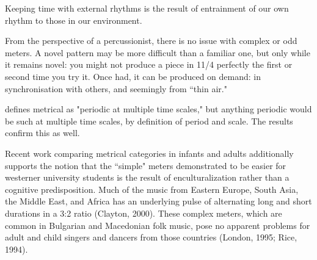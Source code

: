 %

 Keeping time with external rhythms is the result of entrainment of our own rhythm to those in our environment. \citep{chronobiology, musicCognition} 

From the perspective of a percussionist, there is no issue with complex or odd meters. A novel pattern may be more difficult than a familiar one, but only while it remains novel: you might not produce a piece in 11/4 perfectly the first or second time you try it. Once had, it can be produced on demand: in synchronisation with others, and seemingly from ``thin air."

\citep{patel2005} defines metrical as "periodic at multiple time scales," but anything periodic would be such at multiple time scales, by definition of period and scale. The results confirm this as well. 









Recent work comparing metrical categories in infants and adults additionally supports the notion that the ``simple" meters demonstrated to be easier for westerner university students is the result of enculturalization rather than a cognitive predisposition. 
Much of the music from Eastern Europe, South Asia, the Middle East, and Africa has an underlying pulse of alternating long and short durations in a 3:2 ratio (Clayton, 2000). These complex meters, which are common in Bulgarian and Macedonian folk music, pose no apparent problems for adult and child singers and dancers from those countries (London, 1995; Rice, 1994). \citep{hannon2005}


